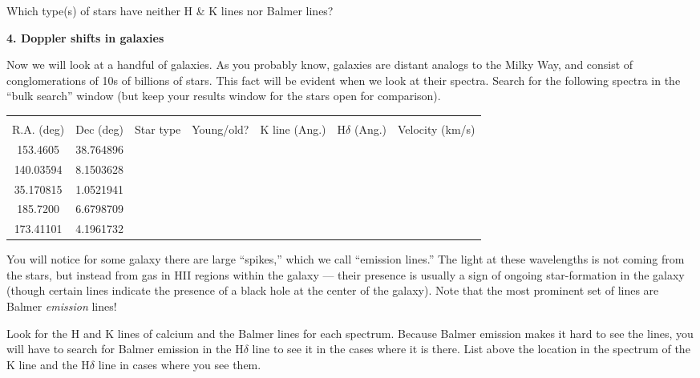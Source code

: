\noindent Which type(s) of stars have neither H \& K lines nor Balmer
lines?

\vspace{30pt}

\noindent
{\bf 4. Doppler shifts in galaxies}

\noindent Now we will look at a handful of galaxies.  As you probably
know, galaxies are distant analogs to the Milky Way, and consist of
conglomerations of 10s of billions of stars. This fact will be evident
when we look at their spectra. Search for the following spectra in the
``bulk search'' window (but keep your results window for the stars
open for comparison). 

\begin{center}
\begin{tabular}{ccccccc} \hline \\ [-6pt]
R.A. (deg)  & Dec (deg)  & \hspace{0.02cm} Star type \hspace{0.02cm} 
& Young/old?
& \hspace{0.02cm} K line (Ang.) \hspace{0.02cm} 
& \hspace{0.02cm} H$\delta$ (Ang.) \hspace{0.02cm} 
& \hspace{0.02cm} Velocity (km/s) \hspace{0.02cm} 
\\ [6pt]
\hline
153.4605 &  38.764896 & & & \\ \hline
140.03594 &  8.1503628 & & & \\ \hline
35.170815 &  1.0521941 & & & \\ \hline
185.7200 &  6.6798709 & & & \\ \hline
173.41101 &  4.1961732 & & & \\ \hline
\end{tabular}
\end{center}

\noindent You will notice for some galaxy there are large ``spikes,''
which we call ``emission lines.'' The light at these wavelengths is
not coming from the stars, but instead from gas in HII regions within
the galaxy --- their presence is usually a sign of ongoing
star-formation in the galaxy (though certain lines indicate the
presence of a black hole at the center of the galaxy).  Note that the
most prominent set of lines are Balmer {\it emission} lines!

\noindent Look for the H and K lines of calcium and the Balmer lines
for each spectrum.  Because Balmer emission makes it hard to see the
lines, you will have to search for Balmer emission in the H$\delta$
line to see it in the cases where it is there.  List above the
location in the spectrum of the K line and the H$\delta$ line in cases
where you see them. 


